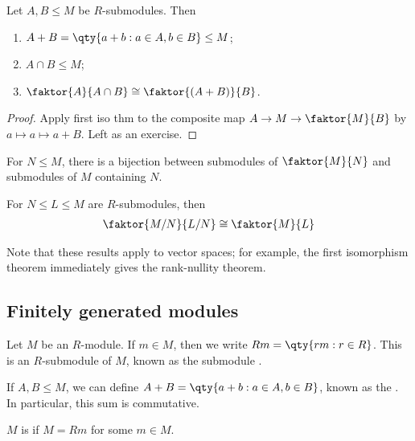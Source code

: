 \begin{theorem}
	Let $A, B \leq M$ be $R$-submodules.
	Then
	\begin{enumerate}
		\item $A + B = \qty{a + b : a \in A, b \in B} \leq M$;
		\item $A \cap B \leq M$;
		\item $\faktor{A}{A \cap B} \cong \faktor{(A + B)}{B}$.
	\end{enumerate}
\end{theorem}

\begin{proof}
	Apply first iso thm to the composite map $A \to M \to \faktor{M}{B}$ by $a \mapsto a \mapsto a + B$.
	Left as an exercise.
\end{proof} 

For $N \leq M$, there is a bijection between submodules of $\faktor{M}{N}$ and submodules of $M$ containing $N$.

\begin{theorem}
	For $N \leq L \leq M$ are $R$-submodules, then
	\begin{align*}
		\faktor{M/N}{L/N} \cong \faktor{M}{L}
	\end{align*}
\end{theorem}

Note that these results apply to vector spaces; for example, the first isomorphism theorem immediately gives the rank-nullity theorem.

\subsection{Finitely generated modules}
\begin{definition}
	Let $M$ be an $R$-module.
	If $m \in M$, then we write $Rm = \qty{rm : r \in R}$.
	This is an $R$-submodule of $M$, known as the submodule .
\end{definition}

\begin{definition}
	If $A, B \leq M$, we can define $A + B = \qty{a + b : a \in A, b \in B}$, known as the .
	In particular, this sum is commutative.
\end{definition} 

\begin{definition}[Cyclic]
	$M$ is  if $M = Rm$ for some $m \in M$.
\end{definition} 

